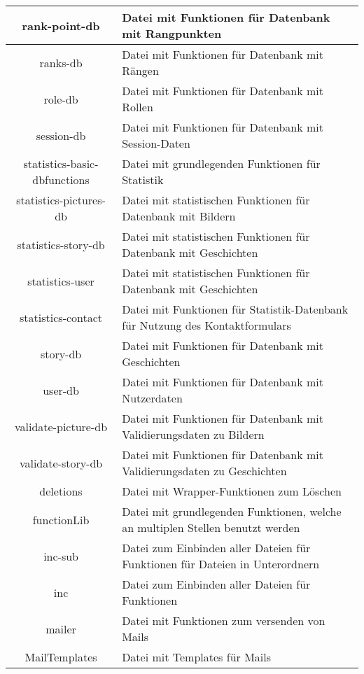\begin{longtable}[H]{|c|p{10cm}|}
	rank-point-db                & Datei mit Funktionen für Datenbank mit Rangpunkten \\ \hline
	ranks-db                     & Datei mit Funktionen für Datenbank mit Rängen \\ \hline
	role-db                      & Datei mit Funktionen für Datenbank mit Rollen \\ \hline
	session-db                   & Datei mit Funktionen für Datenbank mit Session-Daten \\ \hline
	statistics-basic-dbfunctions & Datei mit grundlegenden Funktionen für Statistik \\ \hline
	statistics-pictures-db       & Datei mit statistischen Funktionen für Datenbank mit Bildern \\ \hline
	statistics-story-db          & Datei mit statistischen Funktionen für Datenbank mit Geschichten \\ \hline
	statistics-user              & Datei mit statistischen Funktionen für Datenbank mit Geschichten \\ \hline
	statistics-contact           & Datei mit Funktionen für Statistik-Datenbank für Nutzung des Kontaktformulars \\ \hline
	story-db                     & Datei mit Funktionen für Datenbank mit Geschichten \\ \hline
	user-db                      & Datei mit Funktionen für Datenbank mit Nutzerdaten \\ \hline
	validate-picture-db          & Datei mit Funktionen für Datenbank mit Validierungsdaten zu Bildern \\ \hline
	validate-story-db            & Datei mit Funktionen für Datenbank mit Validierungsdaten zu Geschichten \\ \hline
	deletions                    & Datei mit Wrapper-Funktionen zum Löschen \\ \hline
	functionLib                  & Datei mit grundlegenden Funktionen, welche an multiplen Stellen benutzt werden \\ \hline
	inc-sub                      & Datei zum Einbinden aller Dateien für Funktionen für Dateien in Unterordnern \\ \hline
	inc                          & Datei zum Einbinden aller Dateien für Funktionen \\ \hline
	mailer                       & Datei mit Funktionen zum versenden von Mails \\ \hline
	MailTemplates                & Datei mit Templates für Mails \\ \hline

\end{longtable}
